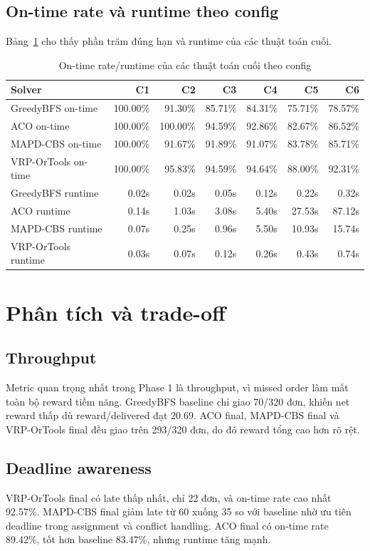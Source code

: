 \documentclass[conference]{IEEEtran}
\begin{document}
\subsection{On-time rate và runtime theo config}
Bảng~\ref{tab:ontime-runtime} cho thấy phần trăm đúng hạn và runtime của các thuật toán cuối.

\begin{table}[t]
\centering
\caption{On-time rate/runtime của các thuật toán cuối theo config}
\label{tab:ontime-runtime}
\begin{tabular}{lrrrrrr}
\toprule
Solver & C1 & C2 & C3 & C4 & C5 & C6 \\
\midrule
GreedyBFS on-time & 100.00\% & 91.30\% & 85.71\% & 84.31\% & 75.71\% & 78.57\% \\
ACO on-time & 100.00\% & 100.00\% & 94.59\% & 92.86\% & 82.67\% & 86.52\% \\
MAPD-CBS on-time & 100.00\% & 91.67\% & 91.89\% & 91.07\% & 83.78\% & 85.71\% \\
VRP-OrTools on-time & 100.00\% & 95.83\% & 94.59\% & 94.64\% & 88.00\% & 92.31\% \\
\midrule
GreedyBFS runtime & 0.02s & 0.02s & 0.05s & 0.12s & 0.22s & 0.32s \\
ACO runtime & 0.14s & 1.03s & 3.08s & 5.40s & 27.53s & 87.12s \\
MAPD-CBS runtime & 0.07s & 0.25s & 0.96s & 5.50s & 10.93s & 15.74s \\
VRP-OrTools runtime & 0.03s & 0.07s & 0.12s & 0.26s & 0.43s & 0.74s \\
\bottomrule
\end{tabular}
\end{table}

\section{Phân tích và trade-off}
\subsection{Throughput}
Metric quan trọng nhất trong Phase 1 là throughput, vì missed order làm mất toàn bộ reward tiềm năng. GreedyBFS baseline chỉ giao 70/320 đơn, khiến net reward thấp dù reward/delivered đạt 20.69. ACO final, MAPD-CBS final và VRP-OrTools final đều giao trên 293/320 đơn, do đó reward tổng cao hơn rõ rệt.

\subsection{Deadline awareness}
VRP-OrTools final có late thấp nhất, chỉ 22 đơn, và on-time rate cao nhất 92.57\%. MAPD-CBS final giảm late từ 60 xuống 35 so với baseline nhờ ưu tiên deadline trong assignment và conflict handling. ACO final có on-time rate 89.42\%, tốt hơn baseline 83.47\%, nhưng runtime tăng mạnh.
\end{document}
